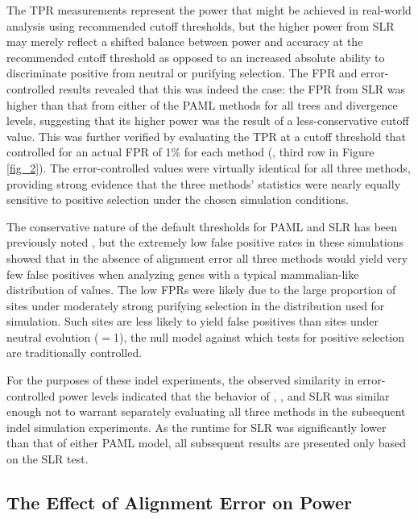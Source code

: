 The TPR measurements represent the power that might be achieved in
real-world analysis using recommended cutoff thresholds, but the
higher power from SLR may merely reflect a shifted balance between
power and accuracy at the recommended cutoff threshold as opposed to
an increased absolute ability to discriminate positive from neutral or
purifying selection. The FPR and error-controlled \tpr results
revealed that this was indeed the case: the FPR from SLR was higher
than that from either of the PAML methods for all trees and divergence
levels, suggesting that its higher power was the result of a
less-conservative cutoff value. This was further verified by
evaluating the TPR at a cutoff threshold that controlled for an actual
FPR of 1\% for each method (\tpr{}, third row in Figure
\ref{fig_2}). The error-controlled \tpr values were virtually
identical for all three methods, providing strong evidence that the
three methods' \sw statistics were nearly equally sensitive to
positive selection under the chosen simulation conditions.

The conservative nature of the default thresholds for PAML and SLR has
been previously noted
\citep{Anisimova2002,Yang2005Bayes,Massingham2005}, but the extremely
low false positive rates in these simulations showed that in the
absence of alignment error all three methods would yield very few
false positives when analyzing genes with a typical mammalian-like
distribution of \omg values. The low FPRs were likely due to the large
proportion of sites under moderately strong purifying selection in the
\omg distribution used for simulation. Such sites are less likely to
yield false positives than sites under neutral evolution (\omg$=$1), the
null model against which tests for positive selection are
traditionally controlled.

For the purposes of these indel experiments, the observed similarity in
error-controlled power levels indicated that the behavior of \mtwo,
\meight, and SLR was similar enough not to warrant separately
evaluating all three methods in the subsequent indel simulation
experiments. As the runtime for SLR was significantly lower than that
of either PAML model, all subsequent results are presented only based
on the SLR test.

\subsection{The Effect of Alignment Error on \Sw Power}

